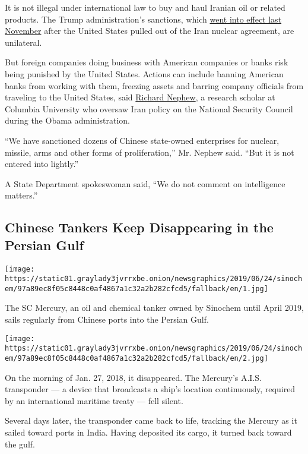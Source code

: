 It is not illegal under international law to buy and haul Iranian oil or
related products. The Trump administration's sanctions, which
\href{https://www.treasury.gov/resource-center/sanctions/programs/pages/iran.aspx}{went
into effect last November} after the United States pulled out of the
Iran nuclear agreement, are unilateral.

But foreign companies doing business with American companies or banks
risk being punished by the United States. Actions can include banning
American banks from working with them, freezing assets and barring
company officials from traveling to the United States, said
\href{https://energypolicy.columbia.edu/richard-nephew}{Richard Nephew},
a research scholar at Columbia University who oversaw Iran policy on the
National Security Council during the Obama administration.

``We have sanctioned dozens of Chinese state-owned enterprises for
nuclear, missile, arms and other forms of proliferation,'' Mr. Nephew
said. ``But it is not entered into lightly.''

A State Department spokeswoman said, ``We do not comment on intelligence
matters.''

\hypertarget{chinese-tankers-keep-disappearing-in-the-persian-gulf}{%
\subsection{Chinese Tankers Keep Disappearing in the Persian
Gulf}\label{chinese-tankers-keep-disappearing-in-the-persian-gulf}}

\texttt{[image: https://static01.graylady3jvrrxbe.onion/newsgraphics/2019/06/24/sinochem/97a89ec8f05c8448c0af4867a1c32a2b282cfcd5/fallback/en/1.jpg]}

The SC Mercury, an oil and chemical tanker owned by Sinochem until April
2019, sails regularly from Chinese ports into the Persian Gulf.

\texttt{[image: https://static01.graylady3jvrrxbe.onion/newsgraphics/2019/06/24/sinochem/97a89ec8f05c8448c0af4867a1c32a2b282cfcd5/fallback/en/2.jpg]}

On the morning of Jan. 27, 2018, it disappeared. The Mercury's A.I.S.
transponder --- a device that broadcasts a ship's location continuously,
required by an international maritime treaty --- fell silent.

Several days later, the transponder came back to life, tracking the
Mercury as it sailed toward ports in India. Having deposited its cargo,
it turned back toward the gulf.

